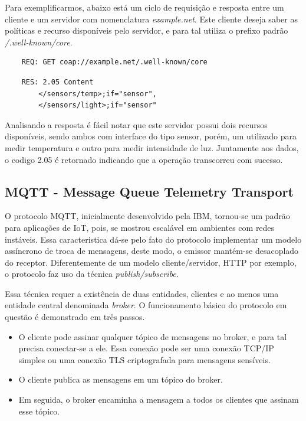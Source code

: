 Para exemplificarmos, abaixo está um ciclo de requisição e resposta entre um cliente e um servidor com nomenclatura \textit{example.net}.
Este cliente deseja saber as políticas e recurso disponíveis pelo servidor, e para tal utiliza o prefixo padrão \textit{/.well-known/core}.

\begin{verbatim}
    REQ: GET coap://example.net/.well-known/core
\end{verbatim}

\begin{verbatim}
    RES: 2.05 Content
        </sensors/temp>;if="sensor",
        </sensors/light>;if="sensor"
\end{verbatim}


Analisando a resposta é fácil notar que este servidor possui dois recursos disponíveis,
sendo ambos com interface do tipo sensor, porém, um utilizado para medir temperatura e outro para medir intensidade de luz.
Juntamente aos dados, o codigo 2.05 é retornado indicando que a operação transcorreu com sucesso.

\subsection{MQTT - Message Queue Telemetry Transport}

O protocolo MQTT, inicialmente desenvolvido pela IBM, tornou-se um padrão para aplicações de IoT, pois, se mostrou escalável em ambientes com redes instáveis.
Essa caracteristica dá-se pelo fato do protocolo implementar um modelo assíncrono de troca de mensagens, deste modo, o emissor mantém-se desacoplado do receptor.
Diferentemente de um modelo cliente/servidor, HTTP por exemplo, o protocolo faz uso da técnica \textit{publish/subscribe}.


Essa técnica requer a existência de duas entidades, clientes e ao menos uma entidade central denominada \textit{broker}.
O funcionamento básico do protocolo em questão é demonstrado em três passos.

\begin{itemize}
    \item O cliente pode assinar qualquer tópico de mensagens no broker, e para tal precisa conectar-se a ele. Essa conexão pode ser uma conexão TCP/IP simples ou uma conexão TLS criptografada para mensagens sensíveis.
    \item O cliente publica as mensagens em um tópico do broker.
    \item Em seguida, o broker encaminha a mensagem a todos os clientes que assinam esse tópico.
\end{itemize}

